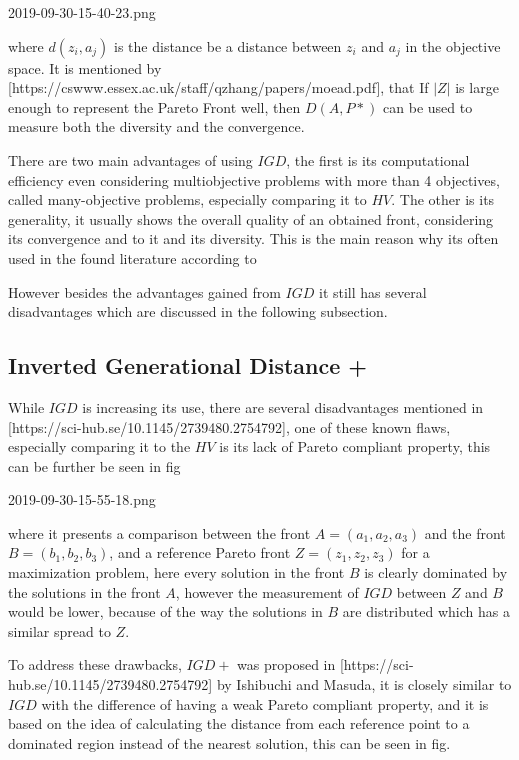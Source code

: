 
2019-09-30-15-40-23.png

where $d(z_i,a_j)$ is the distance be a distance between $z_i$ and $a_j$ in the objective space. It is mentioned by [https://cswww.essex.ac.uk/staff/qzhang/papers/moead.pdf], that If $|Z|$ is large enough to represent the Pareto Front well, then $D(A, P*)$ can be used to measure both the diversity and the convergence.

There are two main advantages of using $IGD$, the first is its computational efficiency even considering multiobjective problems with more than 4 objectives, called many-objective problems, especially comparing it to $HV$. The other is its generality, it usually shows the overall quality of an obtained front, considering its convergence and to it and its diversity. This is the main reason why its often used in the found literature according to 


However besides the advantages gained from $IGD$ it still has several disadvantages which are discussed in the following subsection.

\subsection{Inverted Generational Distance +}

While $IGD$ is increasing its use, there are several disadvantages mentioned in [https://sci-hub.se/10.1145/2739480.2754792], one of these known flaws, especially comparing it to the $HV$ is its lack of Pareto compliant property, this can be further be seen in fig


2019-09-30-15-55-18.png

where it presents a comparison between the front $A = (a_1, a_2, a_3)$ and the front $B = (b_1, b_2, b_3)$, and a reference Pareto front $Z = (z_1, z_2, z_3)$ for a maximization problem, here every solution in the front $B$ is clearly dominated by the solutions in the front $A$, however the measurement of $IGD$ between $Z$ and $B$ would be lower, because of the way the solutions in $B$ are distributed which has a similar spread to $Z$.

To address these drawbacks, $IGD+$ was proposed in [https://sci-hub.se/10.1145/2739480.2754792] by Ishibuchi and Masuda, it is closely similar to $IGD$ with the difference of having a weak Pareto compliant property, and it is based on the idea of calculating the distance from each reference point to a dominated region instead of the nearest solution, this can be seen in fig.

